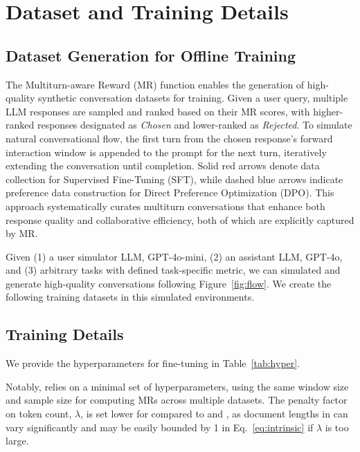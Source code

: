 
\section{Dataset and Training Details}
\label{app:dataset_n_train}

\subsection{Dataset Generation for Offline Training}


The Multiturn-aware Reward (MR) function enables the generation of high-quality synthetic conversation datasets for training. Given a user query, multiple LLM responses are sampled and ranked based on their MR scores, with higher-ranked responses designated as \textit{Chosen} and lower-ranked as \textit{Rejected}. To simulate natural conversational flow, the first turn from the chosen response's forward interaction window is appended to the prompt for the next turn, iteratively extending the conversation until completion. Solid red arrows denote data collection for Supervised Fine-Tuning (SFT), while dashed blue arrows indicate preference data construction for Direct Preference Optimization (DPO). This approach systematically curates multiturn conversations that enhance both response quality and collaborative efficiency, both of which are explicitly captured by MR.

Given (1) a user simulator LLM, \eg GPT-4o-mini, (2) an assistant LLM, GPT-4o, and (3) arbitrary tasks with defined task-specific metric, we can simulated and generate high-quality conversations following Figure~\ref{fig:flow}. We create the following training datasets in this simulated environments. 



\subsection{Training Details}

We provide the hyperparameters for \name{} fine-tuning in Table~\ref{tab:hyper}. 

Notably, \name{} relies on a minimal set of hyperparameters, using the same window size and sample size for computing MRs across multiple datasets. The penalty factor on token count, $\lambda$, is set lower for \doc compared to \code and \mathc, as document lengths in \doc can vary significantly and may be easily bounded by 1 in Eq.~\ref{eq:intrinsic} if $\lambda$ is too large.
